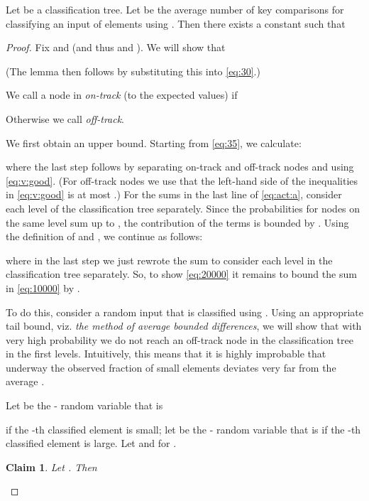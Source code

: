 \documentclass[prodmode,acmtalg]{acmsmall}
\newtheorem{claim}[theorem]{Claim}
\begin{document}
\begin{lemma}\label{lemma:01}
Let  be a classification tree. Let  be the average number of 
key comparisons for classifying an input of  elements using . 
Then there exists a constant  such that 
\begin{rm}
\end{rm}\end{lemma}
\begin{proof}
    Fix  and  (and thus  and ). We will show that 
    
    (The lemma then follows by substituting this into \eqref{eq:30}.)

    We call a node  in  \emph{on-track} (to the expected values)  if 
    
    Otherwise we call  \emph{off-track}.
    
    
    We first obtain an upper bound. Starting from \eqref{eq:35}, we
    calculate:
    
where the last step follows by separating on-track and off-track nodes and using
\eqref{eq:v:good}.  (For off-track nodes we use that the left-hand side of the
inequalities in \eqref{eq:v:good} is at most .) For the sums in the last line
of \eqref{eq:act:a}, consider each level of the classification tree separately.
Since the probabilities  for nodes  on the same level sum up to
, the contribution of the  terms is bounded by . Using
the definition of  and , we continue
as follows:


where in the last step we just rewrote the sum to consider each level in the classification
tree separately.
So, to show \eqref{eq:20000} it  remains to
bound the sum in \eqref{eq:10000} by . 

To do this, consider a random input that is classified using .
Using an appropriate tail bound, viz. \emph{the method of average bounded differences},  
we will show that with very high probability we do not reach an off-track node in the
classification tree in the first  levels. Intuitively, this means 
that it is highly improbable that underway the observed fraction of small elements 
deviates very far from the average . 

Let  be the - random variable that is

if the -th classified element is small; let  be the - random
variable that is  if the -th classified element is large. Let  and  for .

\begin{claim}
    Let . Then 
    
\end{claim}


\end{proof}
\end{document}
